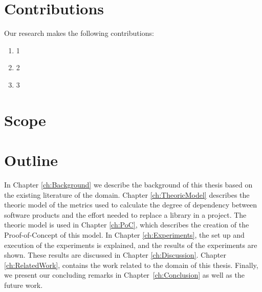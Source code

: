 \section{Contributions}
Our research makes the following contributions:
\begin{enumerate}
	\item 1
	\item 2
	\item 3
\end{enumerate}

\section{Scope} %

\section{Outline}
In Chapter \ref{ch:Background} we describe the background of this thesis based on the existing literature of the domain.
Chapter \ref{ch:TheoricModel} describes the theoric model of the metrics used to calculate the degree of dependency between software products and the effort needed to replace a library in a project.
The theoric model is used in Chapter \ref{ch:PoC}, which describes the creation of the Proof-of-Concept of this model.
In Chapter \ref{ch:Experiments}, the set up and execution of the experiments is explained, and the results of the experiments are shown. These results are discussed in Chapter \ref{ch:Discussion}. Chapter \ref{ch:RelatedWork}, contains the work related to the domain of this thesis.
Finally, we present our concluding remarks in Chapter~\ref{ch:Conclusion} as well as the future work.
